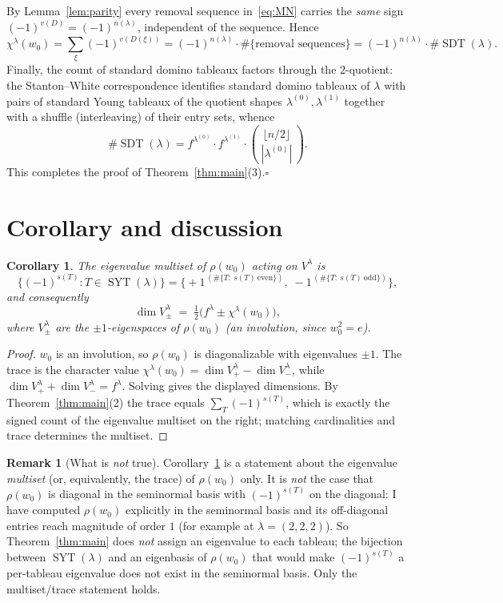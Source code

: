 \documentclass[11pt]{article}
\newtheorem{corollary}{Corollary}
\theoremstyle{definition}
\newtheorem{remark}{Remark}
\DeclareMathOperator{\SYT}{SYT}
\DeclareMathOperator{\SDT}{SDT}
\newcommand{\wzero}{w_0}
\newcommand{\Vlam}{V^\lambda}
\begin{document}
By Lemma~\ref{lem:parity} every removal sequence in~\eqref{eq:MN} carries the
\emph{same} sign $(-1)^{v(D)}=(-1)^{n(\lambda)}$, independent of the sequence.
Hence
\[
\chi^\lambda(\wzero)
=\sum_{\xi}(-1)^{v(D(\xi))}
=(-1)^{n(\lambda)}\cdot\#\{\text{removal sequences}\}
=(-1)^{n(\lambda)}\cdot\#\SDT(\lambda).
\]
Finally, the count of standard domino tableaux factors through the $2$-quotient:
the Stanton--White correspondence identifies standard domino tableaux of
$\lambda$ with pairs of standard Young tableaux of the quotient shapes
$\lambda^{(0)},\lambda^{(1)}$ together with a shuffle (interleaving) of their
entry sets, whence
\[
\#\SDT(\lambda)=f^{\lambda^{(0)}}\cdot f^{\lambda^{(1)}}\cdot
\binom{\lfloor n/2\rfloor}{\,|\lambda^{(0)}|\,}.
\]
This completes the proof of Theorem~\ref{thm:main}(3).\qquad$\square$

\section{Corollary and discussion}

\begin{corollary}\label{cor:eig}
The eigenvalue multiset of $\rho(\wzero)$ acting on $\Vlam$ is
\[
\bigl\{(-1)^{s(T)}:T\in\SYT(\lambda)\bigr\}
=\bigl\{+1^{\,(\#\{T:\ s(T)\ \mathrm{even}\})},\;
-1^{\,(\#\{T:\ s(T)\ \mathrm{odd}\})}\bigr\},
\]
and consequently
\[
\dim \Vlam_{\pm}\;=\;\tfrac12\bigl(f^\lambda\pm\chi^\lambda(\wzero)\bigr),
\]
where $\Vlam_\pm$ are the $\pm1$-eigenspaces of $\rho(\wzero)$ (an involution,
since $\wzero^2=e$).
\end{corollary}

\begin{proof}
$\wzero$ is an involution, so $\rho(\wzero)$ is diagonalizable with eigenvalues
$\pm1$.  The trace is the character value $\chi^\lambda(\wzero)=\dim\Vlam_+-\dim\Vlam_-$,
while $\dim\Vlam_++\dim\Vlam_-=f^\lambda$.  Solving gives the displayed
dimensions.  By Theorem~\ref{thm:main}(2) the trace equals
$\sum_T(-1)^{s(T)}$, which is exactly the signed count of the eigenvalue multiset
on the right; matching cardinalities and trace determines the multiset.
\end{proof}

\begin{remark}[What is \emph{not} true]\label{rem:notdiag}
Corollary~\ref{cor:eig} is a statement about the eigenvalue \emph{multiset} (or,
equivalently, the trace) of $\rho(\wzero)$ only.  It is \emph{not} the case that
$\rho(\wzero)$ is diagonal in the seminormal basis with $(-1)^{s(T)}$ on the
diagonal: I have computed $\rho(\wzero)$ explicitly in the seminormal basis and
its off-diagonal entries reach magnitude of order $1$ (for example at
$\lambda=(2,2,2)$).  So Theorem~\ref{thm:main} does \emph{not} assign an eigenvalue
to each tableau; the bijection between $\SYT(\lambda)$ and an eigenbasis of
$\rho(\wzero)$ that would make $(-1)^{s(T)}$ a per-tableau eigenvalue does not
exist in the seminormal basis.  Only the multiset/trace statement holds.
\end{remark}
\end{document}
